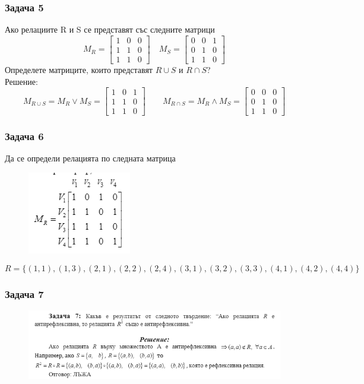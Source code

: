 \documentclass[fleqn, 12pt]{article}
\theoremstyle{definition}
\begin{document}
\subsubsection*{Задача 5}
Ако релациите R и S се представят със следните матрици
$$M_R = 
\begin{bmatrix}
1 & 0 & 0\\
1 & 1 & 0 \\
1 & 1 & 0 
\end{bmatrix} 
\quad
M_S = 
\begin{bmatrix}
0 & 0 & 1\\
0 & 1 & 0 \\
1 & 1 & 0 
\end{bmatrix}  
$$
Определете матриците, които представят $R \cup S$ и $R \cap S$? \\
Решение: \\
$$
M_{R \cup S} = M_R \lor M_S = 
\begin{bmatrix}
1 & 0 & 1\\
1 & 1 & 0\\
1 & 1 & 0
\end{bmatrix}
\qquad
M_{R \cap S} = M_R \land M_S =
\begin{bmatrix}
0 & 0 & 0\\
0 & 1 & 0\\
1 & 1 & 0
\end{bmatrix}
$$
\newpage
\subsubsection*{Задача 6}
Да се определи релацията по следната матрица
\begin{figure} [htp!]
\includegraphics{Pics/Discrete math/ex6/ex6-task6.png}
\end{figure}
$$R = \{(1, 1), (1, 3), (2, 1), (2, 2), (2, 4), (3, 1), (3, 2), (3, 3), (4, 1), (4, 2), (4, 4) \}$$
\subsubsection*{Задача 7}
\begin{figure} [htp!]
\includegraphics[width=\linewidth]{Pics/Discrete math/ex6/ex6-task7.png}
\end{figure}
\end{document}
